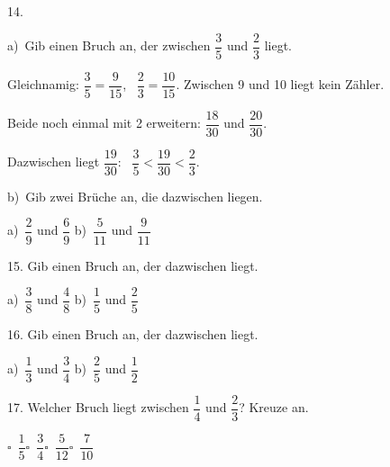 \documentclass[11pt]{article}
\newcommand{\grau}[1]{{\color{mbgrau}#1}}
\begin{document}
\begin{pfaufg}{}{14.}{}
\grau{a)\ Gib einen Bruch an, der zwischen $\dfrac{3}{5}$ und $\dfrac{2}{3}$ liegt.\par\smallskip Gleichnamig: $\dfrac{3}{5} = \dfrac{9}{15}$, \ $\dfrac{2}{3} = \dfrac{10}{15}$. Zwischen 9 und 10 liegt kein Zähler.\par Beide noch einmal mit 2 erweitern: $\dfrac{18}{30}$ und $\dfrac{20}{30}$.\par Dazwischen liegt $\dfrac{19}{30}$: \ $\dfrac{3}{5} < \dfrac{19}{30} < \dfrac{2}{3}$.}
\par\medskip
b)\ Gib zwei Brüche an, die dazwischen liegen. \par\vspace{3pt} a)~$\dfrac{2}{9}$ und $\dfrac{6}{9}$ \qquad b)~$\dfrac{5}{11}$ und $\dfrac{9}{11}$
\end{pfaufg}

\begin{pfaufg}{}{15.}{}
Gib einen Bruch an, der dazwischen liegt. \par\vspace{3pt} a)~$\dfrac{3}{8}$ und $\dfrac{4}{8}$ \qquad b)~$\dfrac{1}{5}$ und $\dfrac{2}{5}$
\end{pfaufg}

\begin{pfaufg}{}{16.}{}
Gib einen Bruch an, der dazwischen liegt. \par\vspace{3pt} a)~$\dfrac{1}{3}$ und $\dfrac{3}{4}$ \qquad b)~$\dfrac{2}{5}$ und $\dfrac{1}{2}$
\end{pfaufg}

\begin{pfaufg}{}{17.}{}
Welcher Bruch liegt zwischen $\dfrac{1}{4}$ und $\dfrac{2}{3}$? Kreuze an.\par\medskip\noindent\hspace*{7mm}\mbox{$\square$\ $\dfrac{1}{5}$}\hspace{10mm}\mbox{$\square$\ $\dfrac{3}{4}$}\hspace{10mm}\mbox{$\square$\ $\dfrac{5}{12}$}\hspace{10mm}\mbox{$\square$\ $\dfrac{7}{10}$}\rule[-3mm]{0pt}{8mm}\par\smallskip 
{}
\end{pfaufg}
\end{document}
